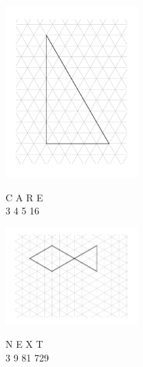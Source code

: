 \documentclass{article}
\begin{document}
\begin{flushleft}
\begin{center}
\end{center}


\begin{center}
\includegraphics[width=2in]{30-60-90Tri.pdf}

C \hspace{0.5in} A \hspace{0.5in} R \hspace{0.5in} E \\
3 \hspace{0.54in} 4 \hspace{0.54in} 5 \hspace{0.54in} 16

\end{center}

\begin{center}
\includegraphics[width=2in]{fish.pdf}

N \hspace{0.5in} E \hspace{0.5in} X \hspace{0.5in} T\\
3 \hspace{0.5in} 9 \hspace{0.52in} 81 \hspace{0.52in} 729

\end{center}
\end{flushleft}
\end{document}
